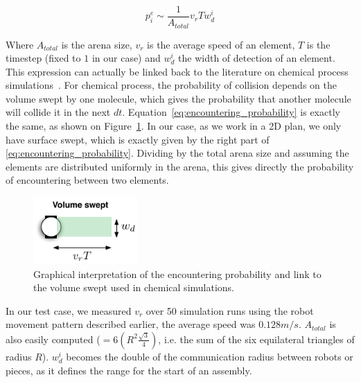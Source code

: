		\begin{equation} \label{eq:encountering_probability}
			p^e_i \sim \frac{1}{A_{total}}v_rTw_d^i
		\end{equation} 
	
		Where $A_{total}$ is the arena size, $v_r$ is the average speed of an element, $T$ is the timestep (fixed to $1$ in our case) and $w_d^i$ the width of detection of an element. This expression can actually be linked back to the literature on chemical process simulations~\cite{Gillespie:1992p8126, Puchalka:2004p4312, Turner:2004p4446}. For chemical process, the probability of collision depends on the volume swept by one molecule, which gives the probability that another molecule will collide it in the next $dt$. Equation~\eqref{eq:encountering_probability} is exactly the same, as shown on Figure~\ref{fig:volume_swept}. In our case, as we work in a 2D plan, we only have surface swept, which is exactly given by the right part of \eqref{eq:encountering_probability}. Dividing by the total arena size and assuming the elements are distributed uniformly in the arena, this gives directly the probability of encountering between two elements.
	
		\begin{figure}[h]
			\centering
			\includegraphics[width=4cm]{img/volume_swept.pdf}
			\caption{Graphical interpretation of the encountering probability and link to the volume swept used in chemical simulations.}
			\label{fig:volume_swept}
		\end{figure}
	
		In our test case, we measured $v_r$ over 50 simulation runs using the robot movement pattern described earlier, the average speed was $0.128 m/s$. $A_{total}$ is also easily computed ($=6 (R^2\frac{\sqrt{3}}{4})$, i.e. the sum of the six equilateral triangles of radius $R$). $w_d^i$ becomes the double of the communication radius between robots or pieces, as it defines the range for the start of an assembly.
	
	
